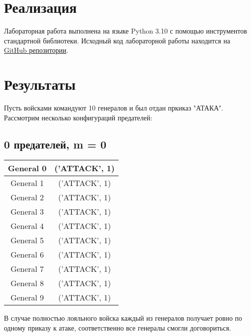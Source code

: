 \documentclass[12pt,a4paper]{article}
\begin{document}
            
	\newpage
	
	\section{Реализация}
		Лабораторная работа выполнена на языке Python 3.10 с помощью инструментов стандартной библиотеки. Исходный код лабораторной работы находится на \href{https://github.com/Drusiand/SPbSTU_Computer_Networks.git}{GitHub репозитории}.
	\newpage
	
	\section{Результаты}  
            Пусть войсками командуют 10 генералов и был отдан пркиказ "АТАКА". Рассмотрим несколько конфигураций предателей:
            \subsection{0 предателей, m = 0}
                \begin{center}
                    \begin{tabular}{|c|c|}
                        \hline
                        General 0 & ('ATTACK', 1) \\ \hline
                        General 1 & ('ATTACK', 1) \\ \hline
                        General 2 & ('ATTACK', 1) \\ \hline
                        General 3 & ('ATTACK', 1) \\ \hline
                        General 4 & ('ATTACK', 1) \\ \hline
                        General 5 & ('ATTACK', 1) \\ \hline
                        General 6 & ('ATTACK', 1) \\ \hline
                        General 7 & ('ATTACK', 1) \\ \hline
                        General 8 & ('ATTACK', 1) \\ \hline
                        General 9 & ('ATTACK', 1) \\ \hline
                    \end{tabular}
                \end{center}
                В случае полностью лояльного войска каждый из генералов получает ровно по одному приказу к атаке, соответственно все генералы смогли договориться.
                
\end{document}
